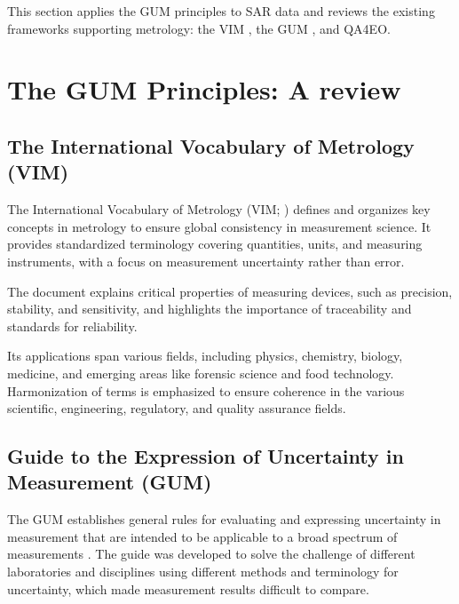 \documentclass[a4paper,10pt,english]{sphinxmanual}
\begin{document}
\sphinxAtStartPar
This section applies the GUM principles to SAR data and reviews the existing frameworks supporting metrology: the VIM {\hyperref[\detokenize{04_uncertainty_analysis:ref-jcgmvim}]{}}, the GUM {\hyperref[\detokenize{04_uncertainty_analysis:ref-jcgmgum}]{}}, and QA4EO.


\section{The GUM Principles: A review}
\label{\detokenize{04_uncertainty_analysis:the-gum-principles-a-review}}

\subsection{The International Vocabulary of Metrology (VIM)}
\label{\detokenize{04_uncertainty_analysis:the-international-vocabulary-of-metrology-vim}}
\sphinxAtStartPar
The International Vocabulary of Metrology (VIM; {\hyperref[\detokenize{04_uncertainty_analysis:ref-jcgmvim}]{}}) defines and organizes key concepts in metrology to ensure global consistency in measurement science. It provides standardized terminology covering quantities, units, and measuring instruments, with a focus on measurement uncertainty rather than error.

\sphinxAtStartPar
The document explains critical properties of measuring devices, such as precision, stability, and sensitivity, and highlights the importance of traceability and standards for reliability.

\sphinxAtStartPar
Its applications span various fields, including physics, chemistry, biology, medicine, and emerging areas like forensic science and food technology. Harmonization of terms is emphasized to ensure coherence in the various scientific, engineering, regulatory, and quality assurance fields.


\subsection{Guide to the Expression of Uncertainty in Measurement (GUM)}
\label{\detokenize{04_uncertainty_analysis:guide-to-the-expression-of-uncertainty-in-measurement-gum}}
\sphinxAtStartPar
The GUM establishes general rules for evaluating and expressing uncertainty in measurement that are intended to be applicable to a broad spectrum of measurements {\hyperref[\detokenize{04_uncertainty_analysis:ref-jcgmgum}]{}}. The guide was developed to solve the challenge of different laboratories and disciplines using different methods and terminology for uncertainty, which made measurement results difficult to compare.
\end{document}
